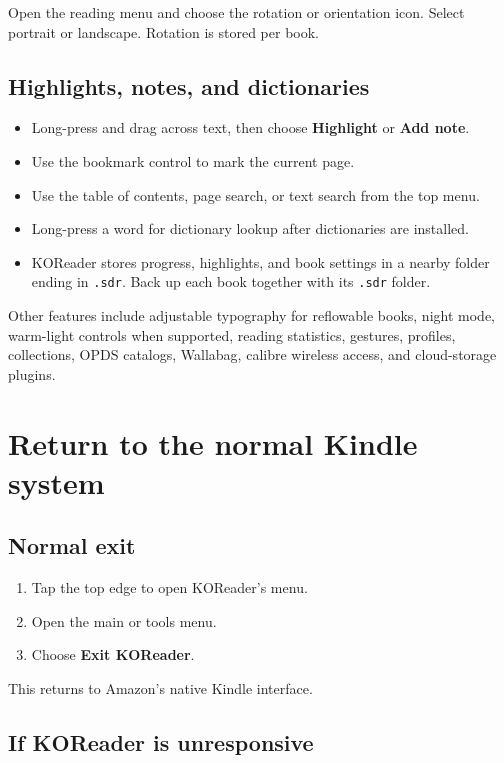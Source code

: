 \documentclass[10pt,letterpaper]{article}
\begin{document}
Open the reading menu and choose the rotation or orientation icon. Select portrait or landscape. Rotation is stored per book.

\subsection{Highlights, notes, and dictionaries}

\begin{itemize}
  \item Long-press and drag across text, then choose \textbf{Highlight} or \textbf{Add note}.
  \item Use the bookmark control to mark the current page.
  \item Use the table of contents, page search, or text search from the top menu.
  \item Long-press a word for dictionary lookup after dictionaries are installed.
  \item KOReader stores progress, highlights, and book settings in a nearby folder ending in \texttt{.sdr}. Back up each book together with its \texttt{.sdr} folder.
\end{itemize}

Other features include adjustable typography for reflowable books, night mode, warm-light controls when supported, reading statistics, gestures, profiles, collections, OPDS catalogs, Wallabag, calibre wireless access, and cloud-storage plugins.

\section{Return to the normal Kindle system}

\subsection{Normal exit}

\begin{enumerate}
  \item Tap the top edge to open KOReader's menu.
  \item Open the main or tools menu.
  \item Choose \textbf{Exit KOReader}.
\end{enumerate}

This returns to Amazon's native Kindle interface.

\subsection{If KOReader is unresponsive}
\end{document}
